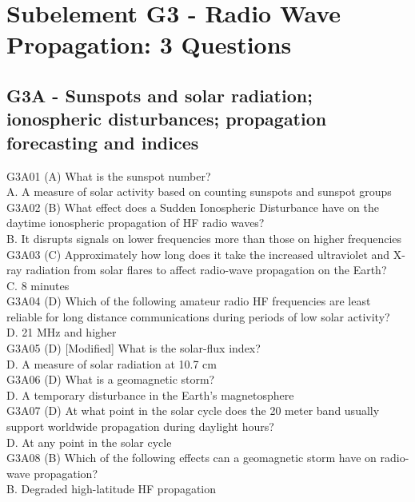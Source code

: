 \documentclass[12pt,letterpaper]{report}
\begin{document}
\chapter{Subelement G3 - Radio Wave Propagation: 3 Questions}
\section{G3A - Sunspots and solar radiation; ionospheric disturbances; propagation forecasting and indices}

G3A01 (A) What is the sunspot number?\\
A. A measure of solar activity based on counting sunspots and sunspot groups\\

G3A02 (B) What effect does a Sudden Ionospheric Disturbance have on the daytime ionospheric propagation of HF radio waves?\\
B. It disrupts signals on lower frequencies more than those on higher frequencies \\

G3A03 (C)  Approximately how long does it take the increased ultraviolet and X-ray radiation from solar flares to affect radio-wave propagation on the Earth?\\
C. 8 minutes\\

G3A04 (D) Which of the following amateur radio HF frequencies are least reliable for long distance communications during periods of low solar activity?\\
D. 21 MHz and higher\\

G3A05 (D) [Modified] What is the solar-flux index?\\
D. A measure of solar radiation at 10.7 cm\\

G3A06 (D) What is a geomagnetic storm?\\
D. A temporary disturbance in the Earth's magnetosphere\\

G3A07 (D) At what point in the solar cycle does the 20 meter band usually support worldwide propagation during daylight hours?\\
D. At any point in the solar cycle\\

G3A08 (B) Which of the following effects can a geomagnetic storm have on radio-wave propagation?\\
B. Degraded high-latitude HF propagation\\
\end{document}
